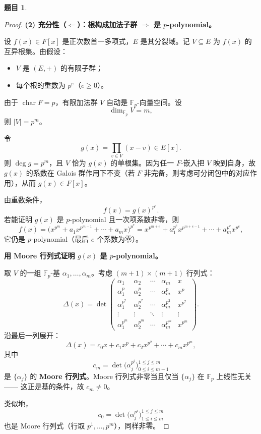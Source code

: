 \documentclass[a4paper]{ctexart}
\theoremstyle{definition}
\newtheorem{example}{题目}[section]
\theoremstyle{analysis}
\theoremstyle{plain}
\begin{document}
\begin{example}
\begin{proof}
\medskip
\textbf{(2) 充分性（\(\Leftarrow\)）：根构成加法子群 \(\Rightarrow\) 是 \(p\)-polynomial。}

设 \(f(x)\in F[x]\) 是正次数首一多项式，\(E\) 是其分裂域。记 \(V\subseteq E\) 为 \(f(x)\) 的互异根集。由假设：
\begin{itemize}
  \item \(V\) 是 \((E,+)\) 的有限子群；
  \item 每个根的重数为 \(p^e\)（\(e\ge 0\)）。
\end{itemize}

由于 \(\operatorname{char}F=p\)，有限加法群 \(V\) 自动是 \(\mathbb F_p\)-向量空间。设
\[
  \dim_{\mathbb F_p}V=m,
\]
则 \(|V|=p^m\)。

令
\[
  g(x)=\prod_{v\in V}(x-v)\in E[x].
\]
则 \(\deg g=p^m\)，且 \(V\) 恰为 \(g(x)\) 的单根集。因为任一 \(F\)-嵌入把 \(V\) 映到自身，故 \(g(x)\) 的系数在 Galois 群作用下不变（若 \(F\) 非完备，则考虑可分闭包中的对应作用），从而 \(g(x)\in F[x]\)。

由重数条件，
\[
  f(x)=g(x)^{p^e}.
\]
若能证明 \(g(x)\) 是 \(p\)-polynomial 且一次项系数非零，则
\[
  f(x)=\bigl(x^{p^m}+a_1x^{p^{m-1}}+\cdots+a_mx\bigr)^{p^e}
      =x^{p^{m+e}}+a_1^{p^e}x^{p^{m+e-1}}+\cdots+a_m^{p^e}x^{p^e},
\]
它仍是 \(p\)-polynomial（最后 \(e\) 个系数为零）。

\textbf{用 Moore 行列式证明 \(g(x)\) 是 \(p\)-polynomial。}

取 \(V\) 的一组 \(\mathbb F_p\)-基 \(\alpha_1,\ldots,\alpha_m\)。考虑 \((m+1)\times(m+1)\) 行列式：
\[
  \Delta(x)=\det\begin{pmatrix}
  \alpha_1   & \alpha_2   & \cdots & \alpha_m   & x \\
  \alpha_1^p & \alpha_2^p & \cdots & \alpha_m^p & x^p \\
  \alpha_1^{p^2} & \alpha_2^{p^2} & \cdots & \alpha_m^{p^2} & x^{p^2} \\
  \vdots     & \vdots     & \ddots & \vdots     & \vdots \\
  \alpha_1^{p^m} & \alpha_2^{p^m} & \cdots & \alpha_m^{p^m} & x^{p^m}
  \end{pmatrix}.
\]
沿最后一列展开：
\[
  \Delta(x)=c_0x+c_1x^p+c_2x^{p^2}+\cdots+c_mx^{p^m},
\]
其中
\[
  c_m=\det\!\bigl(\alpha_j^{p^i}\bigr)_{0\le i\le m-1}^{1\le j\le m}
\]
是 \(\{\alpha_j\}\) 的 \textbf{Moore 行列式}。Moore 行列式非零当且仅当 \(\{\alpha_j\}\) 在 \(\mathbb F_p\) 上线性无关 —— 这正是基的条件，故 \(c_m\neq 0\)。

类似地，
\[
  c_0=\det\!\bigl(\alpha_j^{p^i}\bigr)_{1\le i\le m}^{1\le j\le m}
\]
也是 Moore 行列式（行取 \(p^1,\ldots,p^m\)），同样非零。


\end{proof}
\end{example}
\end{document}
